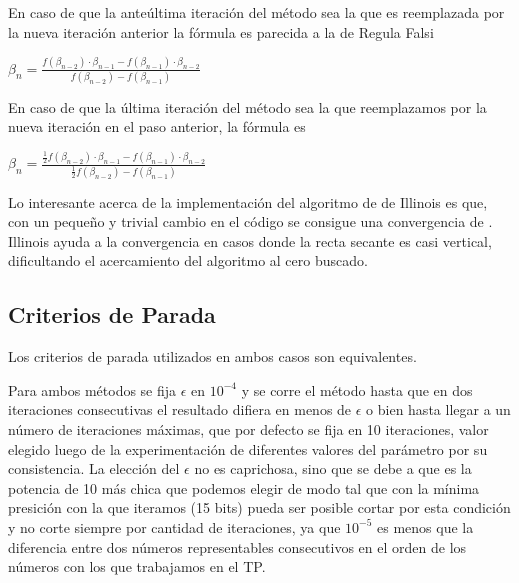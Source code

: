 En caso de que la ante\'ultima iteraci\'on del m\'etodo sea la que es reemplazada por la nueva iteraci\'on anterior la f\'ormula es parecida a la de Regula Falsi

$\beta_n = \frac{f(\beta_{n-2})\cdot \beta_{n-1} - f(\beta_{n-1})\cdot\beta_{n-2}}
{f(\beta_{n-2})-f(\beta_{n-1})}$

En caso de que la \'ultima iteraci\'on del m\'etodo sea la que reemplazamos por la nueva iteraci\'on en el paso anterior, la f\'ormula es

$\beta_n = \frac{\frac{1}{2}f(\beta_{n-2})\cdot \beta_{n-1} - f(\beta_{n-1})\cdot\beta_{n-2}}
{\frac{1}{2}f(\beta_{n-2})-f(\beta_{n-1})}$

Lo interesante acerca de la implementaci\'on del algoritmo de de Illinois es
que, con un peque\~no y trivial cambio en el c\'odigo se consigue una
convergencia de . Illinois ayuda a la convergencia en casos
donde la recta secante es casi vertical, dificultando el acercamiento del
algoritmo al cero buscado.

\subsection{Criterios de Parada}	

Los criterios de parada utilizados en ambos casos son equivalentes.

Para ambos m\'etodos se fija $\epsilon$ en $10^{-4}$ y se corre el m\'etodo hasta que en dos iteraciones consecutivas el resultado difiera en menos de $\epsilon$ o bien hasta llegar a un n\'umero de iteraciones m\'aximas, que por defecto se fija en 10 iteraciones, valor elegido luego de la experimentaci\'on de diferentes valores del par\'ametro por su consistencia.
La elecci\'on del $\epsilon$ no es caprichosa, sino que se debe a que es la potencia de 10 m\'as chica que podemos elegir de modo tal que con la m\'inima presici\'on con la que iteramos (15 bits) pueda ser posible cortar por esta condici\'on y no corte siempre por cantidad de iteraciones, ya que $10^{-5}$ es menos que la diferencia entre dos n\'umeros representables consecutivos en el orden de los n\'umeros con los que trabajamos en el TP.
